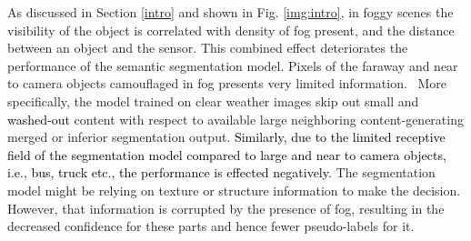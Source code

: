 \documentclass[final,5p,times,twocolumn]{elsarticle}
\begin{document}
As discussed in Section \ref{intro} and shown in Fig. \ref{img:intro}, in foggy scenes the visibility of the object is correlated with density of fog present, and the distance between an object and the sensor. 
This combined effect deteriorates the performance of the semantic segmentation model. 
Pixels of the faraway and near to camera objects camouflaged in fog presents very limited information. 
\
More specifically, the model trained on clear weather images skip out small and \textcolor{black}{washed-out} content with respect to available large neighboring content-generating merged or inferior segmentation output. 
\textcolor{black}{Similarly, due to the limited receptive field of the segmentation model 
compared to large and near to camera objects, i.e., bus, truck etc., the performance is effected negatively.}
The segmentation model might be relying on texture or structure information to make the decision. However, that information is corrupted by the presence of fog, resulting in the decreased confidence for these parts and hence fewer pseudo-labels for it.
\end{document}
